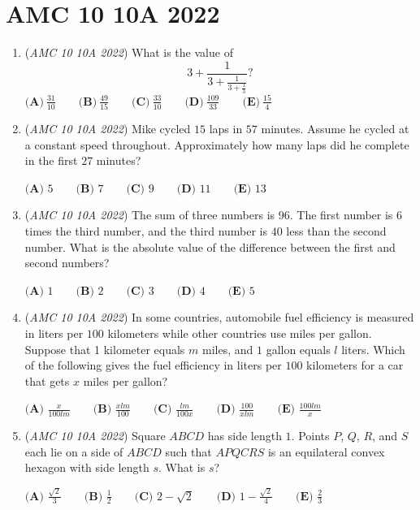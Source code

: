 \section{AMC 10 10A 2022}
        \begin{enumerate}
        	\item (\textit{AMC 10 10A 2022}) What is the value of 
 \[3+\frac{1}{3+\frac{1}{3+\frac13}}?\]
$\textbf{(A)}\ \frac{31}{10}\qquad\textbf{(B)}\ \frac{49}{15}\qquad\textbf{(C)}\ \frac{33}{10}\qquad\textbf{(D)}\ \frac{109}{33}\qquad\textbf{(E)}\ \frac{15}{4}$


	\item (\textit{AMC 10 10A 2022}) Mike cycled $15$ laps in $57$ minutes. Assume he cycled at a constant speed throughout. Approximately how many laps did he complete in the first $27$ minutes?


 $\textbf{(A) } 5 \qquad\textbf{(B) } 7 \qquad\textbf{(C) } 9 \qquad\textbf{(D) } 11 \qquad\textbf{(E) } 13$


	\item (\textit{AMC 10 10A 2022}) The sum of three numbers is $96.$ The first number is $6$ times the third number, and the third number is $40$ less than the second number. What is the absolute value of the difference between the first and second numbers?


 $\textbf{(A) } 1 \qquad \textbf{(B) } 2 \qquad \textbf{(C) } 3 \qquad \textbf{(D) } 4 \qquad \textbf{(E) } 5$


	\item (\textit{AMC 10 10A 2022}) In some countries, automobile fuel efficiency is measured in liters per $100$ kilometers while other countries use miles per gallon. Suppose that 1 kilometer equals $m$ miles, and $1$ gallon equals $l$ liters. Which of the following gives the fuel efficiency in liters per $100$ kilometers for a car that gets $x$ miles per gallon?


 $\textbf{(A) } \frac{x}{100lm} \qquad \textbf{(B) } \frac{xlm}{100} \qquad \textbf{(C) } \frac{lm}{100x} \qquad \textbf{(D) } \frac{100}{xlm} \qquad \textbf{(E) } \frac{100lm}{x}$


	\item (\textit{AMC 10 10A 2022}) Square $ABCD$ has side length $1$. Points $P$, $Q$, $R$, and $S$ each lie on a side of $ABCD$ such that $APQCRS$ is an equilateral convex hexagon with side length $s$. What is $s$?


 $\textbf{(A) } \frac{\sqrt{2}}{3} \qquad \textbf{(B) } \frac{1}{2} \qquad \textbf{(C) } 2 - \sqrt{2} \qquad \textbf{(D) } 1 - \frac{\sqrt{2}}{4} \qquad \textbf{(E) } \frac{2}{3}$



\end{enumerate}
